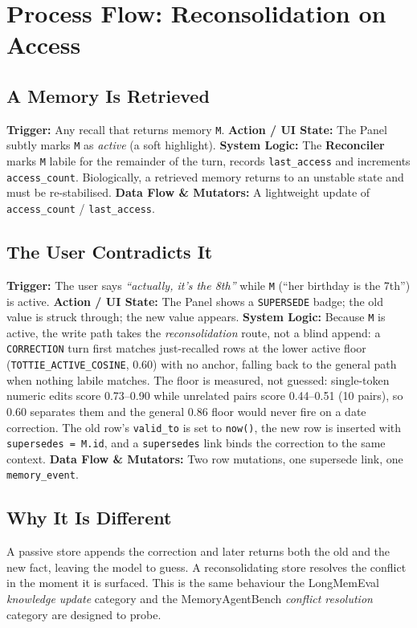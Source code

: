 \chapter{Process Flow: Reconsolidation on Access}

\section{A Memory Is Retrieved}
\textbf{Trigger:} Any recall that returns memory \texttt{M}.
\textbf{Action / UI State:} The Panel subtly marks \texttt{M} as \emph{active} (a soft highlight).
\textbf{System Logic:} The \textbf{Reconciler} marks \texttt{M} labile for the remainder of the turn,
records \texttt{last\_access} and increments \texttt{access\_count}. Biologically, a retrieved memory
returns to an unstable state and must be re-stabilised.
\textbf{Data Flow \& Mutators:} A lightweight update of \texttt{access\_count} / \texttt{last\_access}.

\section{The User Contradicts It}
\textbf{Trigger:} The user says \emph{``actually, it's the 8th''} while \texttt{M} (``her birthday is
the 7th'') is active.
\textbf{Action / UI State:} The Panel shows a \texttt{SUPERSEDE} badge; the old value is struck through;
the new value appears.
\textbf{System Logic:} Because \texttt{M} is active, the write path takes the \emph{reconsolidation}
route, not a blind append: a \texttt{CORRECTION} turn first matches just-recalled rows at the lower
active floor (\texttt{TOTTIE\_ACTIVE\_COSINE}, 0.60) with no anchor, falling back to the general
path when nothing labile matches. The floor is measured, not guessed: single-token numeric edits
score 0.73--0.90 while unrelated pairs score 0.44--0.51 (10 pairs), so 0.60 separates them and the
general 0.86 floor would never fire on a date correction. The old row's \texttt{valid\_to} is set
to \texttt{now()}, the new row is inserted with \texttt{supersedes = M.id}, and a
\texttt{supersedes} link binds the correction to the same context.
\textbf{Data Flow \& Mutators:} Two row mutations, one supersede link, one \texttt{memory\_event}.

\section{Why It Is Different}
A passive store appends the correction and later returns both the old and the new fact, leaving the
model to guess. A reconsolidating store resolves the conflict in the moment it is surfaced. This is
the same behaviour the LongMemEval \emph{knowledge update} category and the MemoryAgentBench
\emph{conflict resolution} category are designed to probe.
